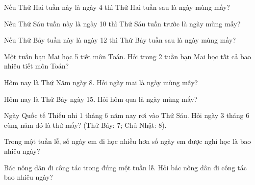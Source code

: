 \begin{ex}
Nếu Thứ Hai tuần này là ngày 4 thì Thứ Hai tuần sau là ngày mùng mấy?
\end{ex}

\begin{ex}
Nếu Thứ Sáu tuần này là ngày 10 thì Thứ Sáu tuần trước là ngày mùng mấy?
\end{ex}

\begin{ex}
Nếu Thứ Bảy tuần này là ngày 12 thì Thứ Bảy tuần sau là ngày mùng mấy?
\end{ex}

\begin{ex}
Một tuần bạn Mai học 5 tiết môn Toán. Hỏi trong 2 tuần bạn Mai học tất cả bao nhiêu tiết môn Toán?
\end{ex}

\begin{ex}
Hôm nay là Thứ Năm ngày 8. Hỏi ngày mai là ngày mùng mấy?
\end{ex}

\begin{ex}
Hôm nay là Thứ Bảy ngày 15. Hỏi hôm qua là ngày mùng mấy?
\end{ex}

\begin{ex}
Ngày Quốc tế Thiếu nhi 1 tháng 6 năm nay rơi vào Thứ Sáu. Hỏi ngày 3 tháng 6 cùng năm đó là thứ mấy? (Thứ Bảy: 7; Chủ Nhật: 8).
\end{ex}

\begin{ex}
Trong một tuần lễ, số ngày em đi học nhiều hơn số ngày em được nghỉ học là bao nhiêu ngày?
\end{ex}

\begin{ex}
Bác nông dân đi công tác trong đúng một tuần lễ. Hỏi bác nông dân đi công tác bao nhiêu ngày?
\end{ex}

